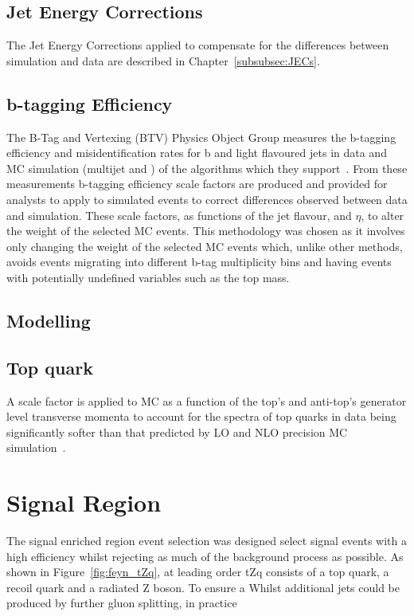\subsection{Jet Energy Corrections}
The Jet Energy Corrections applied to compensate for the differences between simulation and data are described in Chapter~\ref{subsubsec:JECs}.

\subsection{b-tagging Efficiency}\label{subsec:btagEff}
The B-Tag and Vertexing (BTV) Physics Object Group measures the b-tagging efficiency and misidentification rates for b and light flavoured jets in data and MC simulation (multijet and \ttbar) of the algorithms which they support~\cite{Sirunyan:2017ezt}.
From these measurements b-tagging efficiency scale factors are produced and provided for analysts to apply to simulated events to correct differences observed between data and simulation.
These scale factors, as functions of the jet flavour, \pT and $\eta$, to alter the weight of the selected MC events.
This methodology was chosen as it involves only changing the weight of the selected MC events which, unlike other methods, avoids events migrating into different b-tag multiplicity bins and having events with potentially undefined variables such as the top mass.

\subsection{\PU Modelling}

\subsection{Top quark \pt}
A scale factor is applied to \ttbar MC as a function of the top's and anti-top's generator level transverse momenta to account for the \pt spectra of top quarks in data being significantly softer than that predicted by LO and NLO precision MC simulation~\cite{Khachatryan:2015oqa}.

\section{Signal Region}\label{sec:signalRegion}
The signal enriched region event selection was designed select signal events with a high efficiency whilst rejecting as much of the background process as possible.
As shown in Figure~\ref{fig:feyn_tZq}, at leading order tZq consists of a top quark, a recoil quark and a radiated Z boson.
To ensure a 
Whilst additional jets could be produced by further gluon splitting, in practice 

